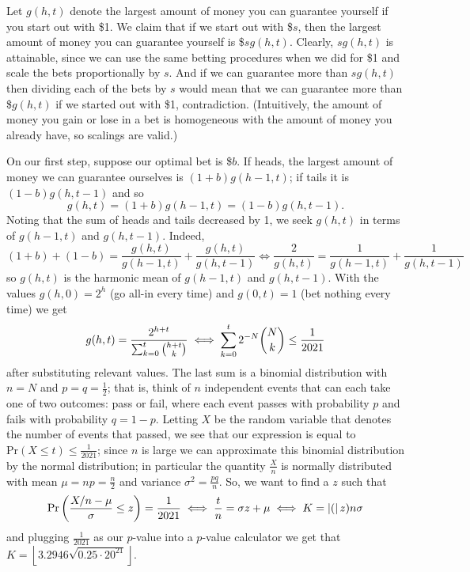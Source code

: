 \begin{solution}\hfil\medskip
  
    Let $g(h, t)$ denote the largest amount of money you can guarantee yourself if you start out with \$1. We claim that if we start out with \$$s$, then 
    the largest amount of money you can guarantee yourself is \$$sg(h, t)$. Clearly, $sg(h, t)$ is attainable, since we can use the same betting procedures
    when we did for \$1 and scale the bets proportionally by $s$. And if we can guarantee more than $sg(h, t)$ then dividing each of the bets by $s$ would mean
    that we can guarantee more than \$$g(h, t)$ if we started out with \$1, contradiction. (Intuitively, the amount of money you gain or lose in a bet is homogeneous
    with the amount of money you already have, so scalings are valid.) \medskip

    On our first step, suppose our optimal bet is \$$b$. If heads, the largest amount of money we can guarantee ourselves is $(1 + b)g(h - 1, t)$; if tails it is $(1 - b)g(h, t - 1)$
    and so $$g(h, t) = (1 + b)g(h - 1, t) = (1 - b)g(h, t - 1).$$ Noting that the sum of heads and tails decreased by 1, we seek $g(h, t)$ in terms of $g(h - 1, t)$ and $g(h, t - 1)$.
    Indeed, $$(1 + b) + (1 - b) = \dfrac{g(h, t)}{g(h - 1, t)} + \dfrac{g(h, t)}{g(h, t - 1)} \iff \dfrac{2}{g(h, t)} = \dfrac{1}{g(h - 1, t)} + \dfrac{1}{g(h, t - 1)}$$
    so $g(h, t)$ is the harmonic mean of $g(h - 1, t)$ and $g(h, t - 1)$. With the values $g(h, 0) = 2^h$ (go all-in every time) and $g(0, t) = 1$ (bet nothing every time)
    we get $$g(h, t) = \dfrac{2^{h + t}}{\sum_{k = 0}^t \binom{h + t}{k}} \iff \sum_{k = 0}^t 2^{-N}\dbinom{N}{k} \leq \dfrac{1}{2021}$$ after substituting relevant values.
    The last sum is a binomial distribution with $n = N$ and $p = q = \frac{1}{2}$; that is, think of $n$ independent events that can each take one of two outcomes:
    pass or fail, where each event passes with probability $p$ and fails with probability $q = 1 - p$. Letting $X$ be the random variable that denotes the number of events
    that passed, we see that our expression is equal to $\text{Pr}(X \leq t) \leq \frac{1}{2021}$; since $n$ is large we can approximate this binomial distribution
    by the normal distribution; in particular the quantity $\frac{X}{n}$ is normally distributed with mean $\mu = np = \frac{n}{2}$ and variance $\sigma^2 = \frac{pq}{n}$. 
    So, we want to find a $z$ such that $$\text{Pr}\left(\dfrac{X/n - \mu}{\sigma} \leq z\right) = \dfrac{1}{2021} \iff \dfrac{t}{n} = \sigma z + \mu \iff K = \left\lvert (\right\rvert z)n \sigma$$
    and plugging $\frac{1}{2021}$ as our $p$-value into a $p$-value calculator we get that $K = \boxed{\left\lfloor 3.2946 \sqrt{0.25 \cdot 20^{21}} \right\rfloor}$.
\end{solution}\bigskip